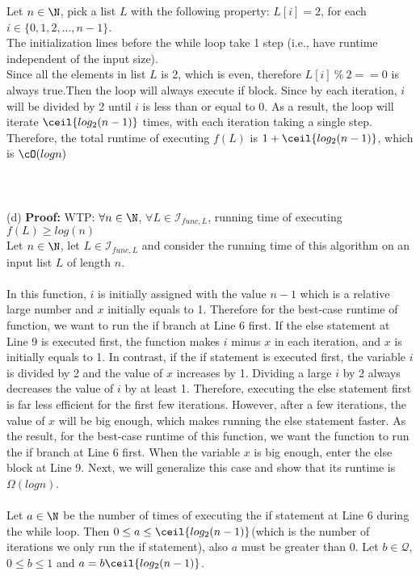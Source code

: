 \documentclass[12pt]{article}
\begin{document}
Let $n \in \N$, pick a list $L$ with the following property: $L[i] = 2$, for each $i \in \{0, 1, 2,..., n -1 \}$.\\
The initialization lines before the while loop take 1 step (i.e., have runtime independent of the input size).\\
Since all the elements in list $L$ is 2, which is even, therefore $L[i]\ \%\ 2 == 0$ is always true.Then the loop will always execute if block. Since by each iteration, $i$ will be divided by 2 until $i$ is less than or equal to 0. As a result, the loop will iterate $\ceil{log_2(n-1)}$ times, with each iteration taking a single step. Therefore, the total runtime of executing $f(L)$ is $1+\ceil{log_2(n-1)}$, which is $\cO(logn)$\\
\\
\\
\\
(d) \textbf{Proof:} WTP: $\forall n \in \N$, $\forall L \in \mathcal{I}_{func,L}$, running time of executing $f(L) \ge log(n)$\\
Let $n \in \N$, let $L \in \mathcal{I}_{func,L}$ and consider the running time of this algorithm on an input list $L$ of length $n$.\\
\\
In this function, $i$ is initially assigned with the value $n-1$ which is a relative large number and $x$ initially equals to 1. Therefore for the best-case runtime of function, we want to run the if branch at Line 6 first. If the else statement at Line 9 is executed first, the function makes $i$ minus $x$ in each iteration, and $x$ is initially equals to 1. In contrast, if the if statement is executed first, the variable $i$ is divided by 2 and the value of $x$ increases by 1. Dividing a large $i$ by 2 always decreases the value of $i$ by at least 1. Therefore, executing the else statement first is far less efficient for the first few iterations. However, after a few iterations, the value of $x$ will be big enough, which makes running the else statement faster. As the result, for the best-case runtime of this function, we want the function to run the if branch at Line 6 first. When the variable $x$ is big enough, enter the else block at Line 9. Next, we will generalize this case and show that its runtime is $\Omega(logn)$.\\
\\
Let $a \in \N$ be the number of times of executing the if statement at Line 6 during the while loop. Then $0 \le a \le \ceil{log_2(n-1)}$(which is the number of iterations we only run the if statement), also $a$ must be greater than 0. Let $b \in \mathcal{Q}$, $0 \le b\le1$ and $a = b\ceil{log_2(n-1)}$.\\
\end{document}
